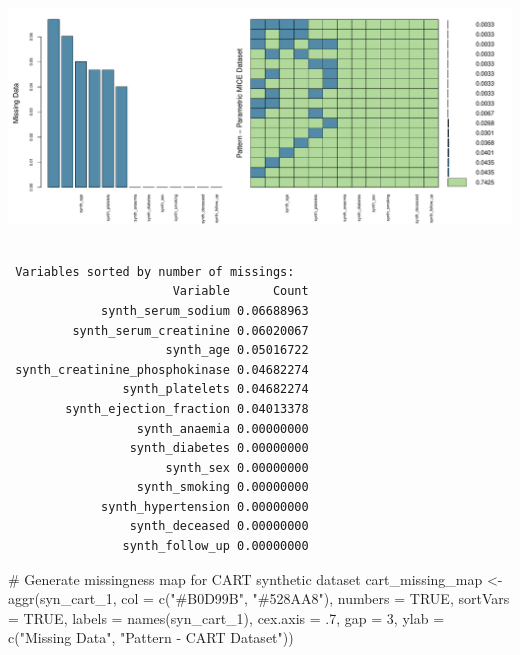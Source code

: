 \documentclass[
  letterpaper,
  DIV=11,
  numbers=noendperiod]{scrartcl}
\newenvironment{Shaded}{\begin{snugshade}}{\end{snugshade}}
\newcommand{\AttributeTok}[1]{\textcolor[rgb]{0.40,0.45,0.13}{#1}}
\newcommand{\CommentTok}[1]{\textcolor[rgb]{0.37,0.37,0.37}{#1}}
\newcommand{\ConstantTok}[1]{\textcolor[rgb]{0.56,0.35,0.01}{#1}}
\newcommand{\DecValTok}[1]{\textcolor[rgb]{0.68,0.00,0.00}{#1}}
\newcommand{\FunctionTok}[1]{\textcolor[rgb]{0.28,0.35,0.67}{#1}}
\newcommand{\NormalTok}[1]{\textcolor[rgb]{0.00,0.23,0.31}{#1}}
\newcommand{\OtherTok}[1]{\textcolor[rgb]{0.00,0.23,0.31}{#1}}
\newcommand{\StringTok}[1]{\textcolor[rgb]{0.13,0.47,0.30}{#1}}
\begin{document}
\begin{center}
\includegraphics[width=1\linewidth,height=\textheight,keepaspectratio]{heart_failure_synthetic_data_project_files/figure-pdf/Missingness Maps-2.pdf}
\end{center}

\begin{verbatim}

 Variables sorted by number of missings: 
                       Variable      Count
             synth_serum_sodium 0.06688963
         synth_serum_creatinine 0.06020067
                      synth_age 0.05016722
 synth_creatinine_phosphokinase 0.04682274
                synth_platelets 0.04682274
        synth_ejection_fraction 0.04013378
                  synth_anaemia 0.00000000
                 synth_diabetes 0.00000000
                      synth_sex 0.00000000
                  synth_smoking 0.00000000
             synth_hypertension 0.00000000
                 synth_deceased 0.00000000
                synth_follow_up 0.00000000
\end{verbatim}

\begin{Shaded}
\begin{Highlighting}[]
\CommentTok{\# Generate missingness map for CART synthetic dataset}
\NormalTok{cart\_missing\_map }\OtherTok{\textless{}{-}} \FunctionTok{aggr}\NormalTok{(syn\_cart\_1, }\AttributeTok{col =} \FunctionTok{c}\NormalTok{(}\StringTok{"\#B0D99B"}\NormalTok{, }\StringTok{"\#528AA8"}\NormalTok{),}
                         \AttributeTok{numbers =} \ConstantTok{TRUE}\NormalTok{, }\AttributeTok{sortVars =} \ConstantTok{TRUE}\NormalTok{,}
                         \AttributeTok{labels =} \FunctionTok{names}\NormalTok{(syn\_cart\_1), }\AttributeTok{cex.axis =}\NormalTok{ .}\DecValTok{7}\NormalTok{,}
                         \AttributeTok{gap =} \DecValTok{3}\NormalTok{, }\AttributeTok{ylab =} \FunctionTok{c}\NormalTok{(}\StringTok{"Missing Data"}\NormalTok{, }\StringTok{"Pattern {-} CART Dataset"}\NormalTok{))}
\end{Highlighting}
\end{Shaded}
\end{document}
